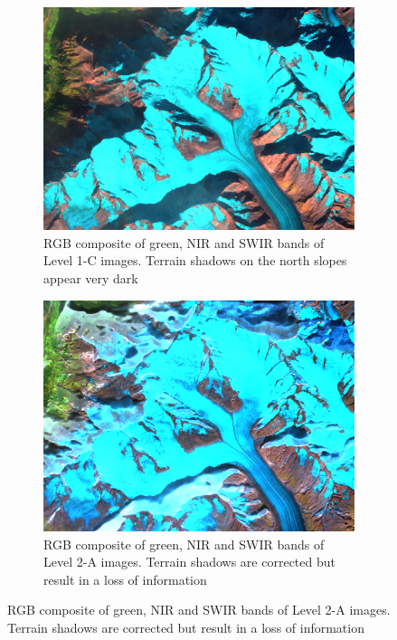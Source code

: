 \documentclass[12pt]{article}
\begin{document}
\begin{figure}[t]
\centering 
  \begin{subfigure}[height=7cm]{0.45\textwidth}
    \includegraphics[width=\textwidth]{RGB_1C}
	\caption{RGB composite of green, NIR and SWIR bands of Level 1-C images. Terrain shadows on the north slopes appear very dark}
		\label{fig:RGB_1C}

	\end{subfigure}
	\hspace{0.5cm}
  	\begin{subfigure}[height=7cm]{0.45\textwidth}
    \includegraphics[width=\textwidth]{RGB_2A}
	\caption{RGB composite of green, NIR and SWIR bands of Level 2-A images. Terrain shadows are corrected but result in a loss of information}
			\label{fig:RGB_2A}
	\end{subfigure}
\end{figure}
\end{document}
